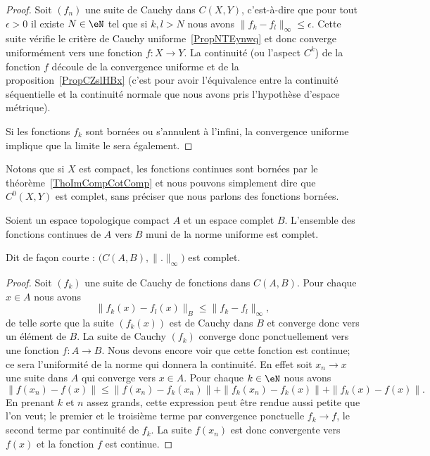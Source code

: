 \begin{proof}
	Soit \( (f_n)\) une suite de Cauchy dans \( C(X,Y)\), c'est-à-dire que pour tout \( \epsilon>0\) il existe \( N\in \eN\) tel que si \( k,l>N\) nous avons \( \| f_k-f_l \|_{\infty}\leq \epsilon\). Cette suite vérifie le critère de Cauchy uniforme~\ref{PropNTEynwq} et donc converge uniformément vers une fonction \( f\colon X\to Y\). La continuité (ou l'aspect \( C^k\)) de la fonction \( f\) découle de la convergence uniforme et de la proposition~\ref{PropCZslHBx} (c'est pour avoir l'équivalence entre la continuité séquentielle et la continuité normale que nous avons pris l'hypothèse d'espace métrique).

	Si les fonctions \( f_k\) sont bornées ou s'annulent à l'infini, la convergence uniforme implique que la limite le sera également.
\end{proof}
Notons que si \( X\) est compact, les fonctions continues sont bornées par le théorème~\ref{ThoImCompCotComp} et nous pouvons simplement dire que \( C^0(X,Y)\) est complet, sans préciser que nous parlons des fonctions bornées.


\begin{lemma}       \label{LemdLKKnd}
	Soient un espace topologique compact \( A\) et un espace complet \( B\). L'ensemble des fonctions continues de \( A\) vers \( B\) muni de la norme uniforme est complet.

	Dit de façon courte : \( \big( C(A,B),\| . \|_{\infty} \big)\) est complet.
\end{lemma}

\begin{proof}
	Soit \( (f_k)\) une suite de Cauchy de fonctions dans \( C(A,B)\). Pour chaque \( x\in A \) nous avons
	\begin{equation}
		\| f_k(x)-f_l(x) \|_B\leq \| f_k-f_l \|_{\infty},
	\end{equation}
	de telle sorte que la suite \( (f_k(x))\) est de Cauchy dans \( B\) et converge donc vers un élément de \( B\). La suite de Cauchy \( (f_k)\) converge donc ponctuellement vers une fonction \( f\colon A\to B\). Nous devons encore voir que cette fonction est continue; ce sera l'uniformité de la norme qui donnera la continuité. En effet soit \( x_n\to x\) une suite dans \( A\) qui converge vers \( x\in A\). Pour chaque \( k\in \eN\) nous avons
	\begin{equation}
		\| f(x_n)-f(x) \|\leq \| f(x_n)-f_k(x_n) \|  +\| f_k(x_n)-f_k(x) \|+\| f_k(x)-f(x) \|.
	\end{equation}
	En prenant \( k\) et \( n\) assez grands, cette expression peut être rendue aussi petite que l'on veut; le premier et le troisième terme par convergence ponctuelle \( f_k\to f\), le second terme par continuité de \( f_k\). La suite \( f(x_n)\) est donc convergente vers \( f(x)\) et la fonction \( f\) est continue.
\end{proof}

